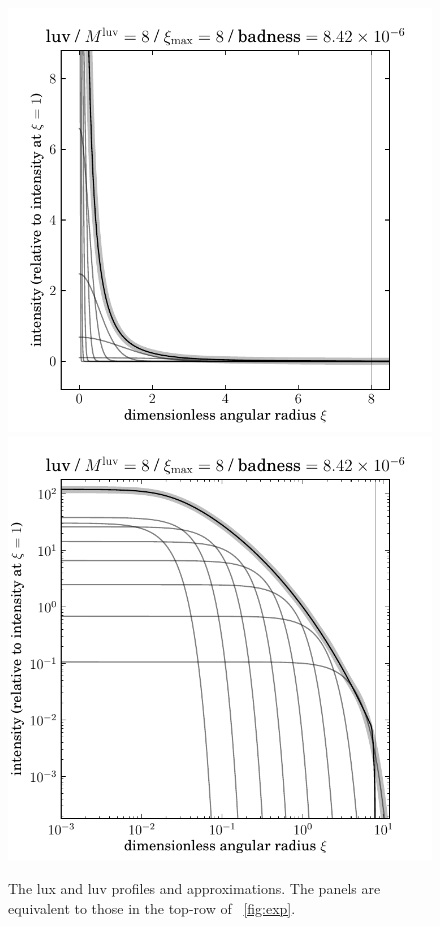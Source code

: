 \documentclass[12pt,pdftex,preprint]{aastex}
\newlength{\figurewidth}
\begin{document}
\begin{figure}
\includegraphics[width=\figurewidth]{luv_K08_MR08_profile.pdf}%
\includegraphics[width=\figurewidth]{luv_K08_MR08_profile_log.pdf}
\caption{The lux and luv profiles and approximations.  The panels are
  equivalent to those in the top-row of \figurename~\ref{fig:exp}.}
\end{figure}
\end{document}
